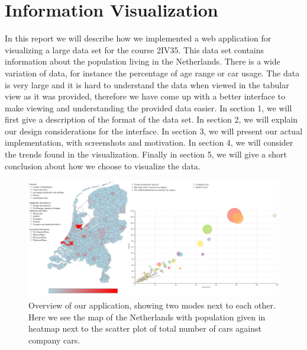 \documentclass[a4paper,twoside,11pt]{article}
\begin{document}
\section*{Information Visualization}
In this report we will describe how we implemented a web application for visualizing a large data set for the course 2IV35. This data set contains information about the population living in the Netherlands.  \newline
There is a wide variation of data, for instance the percentage of age range or car usage. The data is very large and it is hard to understand the data when viewed in the tabular view as it was provided, therefore we have come up with a better interface to make viewing and understanding the provided data easier. \newline
In section 1, we will first give a description of the format of the data set. \newline
In section 2, we will explain our design considerations for the interface. \newline
In section 3, we will present our actual implementation, with screenshots and motivation. \newline
In section 4, we will consider the trends found in the visualization. \newline
Finally in section 5, we will give a short conclusion about how we choose to visualize the data. \newline
\newline
\newline
\newline
\newline
\newline
\begin{figure}[h]
  \begin{center}
    \includegraphics[width=1\textwidth]{FullScreen2}
  \end{center}
  \caption{Overview of our application, showing two modes next to each other. Here we see the map of the Netherlands with population given in heatmap next to the scatter plot of total number of cars against company cars.}
\end{figure}
\end{document}
